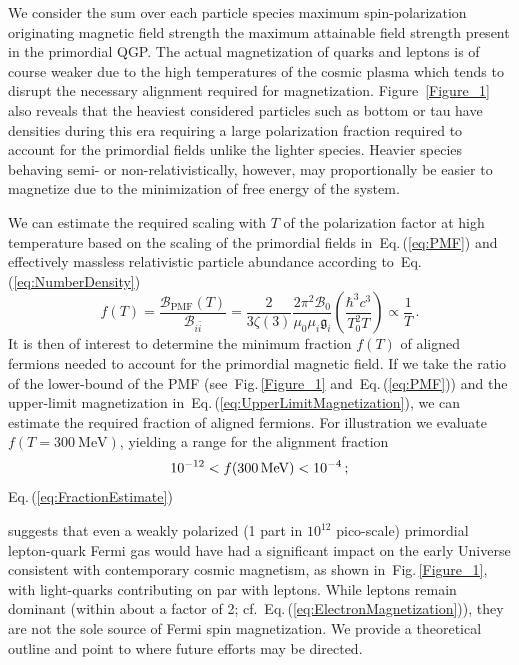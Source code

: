 \documentclass[epjST]{svjour}
\newcommand*{\MeV}{\text{\,MeV}}
\newcommand{\req}[1]{Eq.\,(\ref{#1})}
\newcommand{\rf}[1]{Fig.\,{\ref{#1}}}
\begin{document}
{\color{blue}We consider the sum over each particle species maximum spin-polarization originating magnetic field strength the maximum attainable field strength present in the primordial QGP. The actual magnetization of quarks and leptons is of course  weaker due to the high temperatures of the cosmic plasma which tends to disrupt the necessary alignment required for magnetization. Figure~\ref{Figure_1} also reveals that the heaviest considered particles such as bottom or tau have densities during this era requiring a large polarization fraction required to account for the primordial fields unlike the lighter species. Heavier species behaving semi- or non-relativistically, however, may proportionally be easier to magnetize due to the minimization of free energy of the system.

We can estimate the required scaling with $T$ of the polarization factor at high temperature based on the scaling of the primordial fields in~\req{eq:PMF} and effectively massless relativistic particle abundance according to~\req{eq:NumberDensity}
\begin{equation}
\label{eq:FractionAligned}
f(T) = \frac{\mathcal{B}_\mathrm{PMF}(T)}{\mathcal{B}_{i\bar{i}}} 
= \frac{2}{3\zeta(3)}\frac{2\pi^{2}\mathcal{B}_{0}}{\mu_{0}\mu_{i}\mathfrak{g}_{i}}\left(\frac{\hbar^{3}c^{3}}{T_{0}^{2}T}\right)\propto\frac{1}{T}\,.
\end{equation}
It is then of interest to determine the minimum fraction \(f(T)\) of aligned fermions needed to account for the primordial magnetic field. If we take the ratio of the lower-bound of the PMF (see~\rf{Figure_1} and~\req{eq:PMF}) and the upper-limit magnetization in~\req{eq:UpperLimitMagnetization}, we can estimate the required fraction of aligned fermions. For illustration we evaluate \(f(T=300~\mathrm{MeV})\), yielding a range for the alignment fraction
\begin{equation}
\label{eq:FractionEstimate}
10^{-12} < f(300\MeV) < 10^{-4}\,;
\end{equation}
\req{eq:FractionEstimate}} suggests that even a weakly polarized ({\color{blue}1 part in $10^{12}$} pico-scale) primordial lepton-quark Fermi gas would have had a significant impact on the early Universe consistent with contemporary cosmic magnetism, as shown in~\rf{Figure_1}, with light-quarks contributing on par with leptons. While leptons remain dominant (within about a factor of 2; cf.~\req{eq:ElectronMagnetization}), they are not the sole source of Fermi spin magnetization. We provide a theoretical outline and point to where future efforts may be directed.
\end{document}
